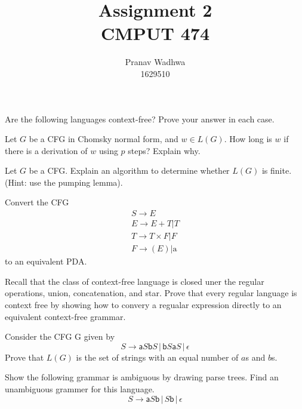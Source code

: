 \documentclass[12pt]{exam}
\title{
  Assignment 2\\
  \large CMPUT 474
}
\author{Pranav Wadhwa\\1629510}
\begin{document}
\maketitle
\noindent

\begin{questions}

  \question{} Are the following languages context-free? Prove your answer in each case.

  \question{} Let $G$ be a CFG in Chomsky normal form, and $w\in L(G)$. How long is $w$ if there is a derivation of $w$ using $p$ steps? Explain why.

  \question{} Let $G$ be a CFG. Explain an algorithm to determine whether $L(G)$ is finite. (Hint: use the pumping lemma).

  \question{} Convert the CFG
  \begin{gather*}
  S\to E\\
    E\to E+T|T\\
    T\to T \times F|F\\
    F\to (E)|\text{a}
    \end{gather*}
  to an equivalent PDA.


  \question{} Recall that the class of context-free language is closed uner the regular operations, union, concatenation, and star. Prove that every regular language is context free by showing how to convery a regualar expression directly to an equivalent context-free grammar.


  \question{} Consider the CFG G given by
  \[S\to \mathsf{a}S\mathsf{b}S\,|\,\mathsf{b}S\mathsf{a}S\,|\,\epsilon\]
  Prove that $L(G)$ is the set of strings with an equal number of $a$s and $b$s.


  \question{}
  Show the following grammar is ambiguous by drawing parse trees. Find an unambiguous grammer for this language.
  \[S\to \mathsf{a}S\mathsf{b}\,|\, S\mathsf{b}\,|\,\epsilon\]



\end{questions}
\end{document}
